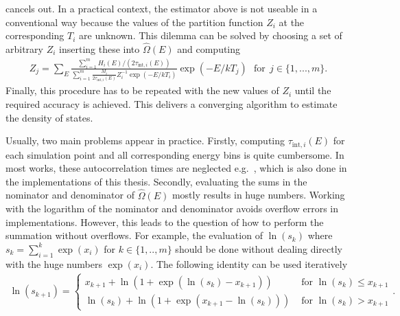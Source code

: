 cancels out. In a practical context, the estimator above is not useable in a conventional way because the values of the partition function $Z_i$
at the corresponding $T_i$ are unknown. This dilemma can be solved by choosing a set of arbitrary $Z_i$ inserting these into $\hat{\Omega}(E)$ and computing
\begin{align*}
    Z_j=\sum_E\frac{\sum_{i=1}^mH_i(E)/(2\tau_{\mathrm{int},i}(E))}{\sum_{i=1}^m\frac{M_i}{2\tau_{\mathrm{int},i}(E)}Z_i^{-1}\exp(-E/kT_i)}\exp(-E/kT_j) \  \  \  \text{for} \  \  j\in\{1,...,m\}.
\end{align*}
Finally, this procedure has to be repeated with the new values of $Z_i$ until the required accuracy is achieved. This delivers a converging algorithm to estimate the 
density of states.~\cite{Janke2012}

Usually, two main problems appear in practice. Firstly, computing $\tau_{\mathrm{int},i}(E)$ for each simulation point and all corresponding energy 
bins is quite cumbersome. In most works, these autocorrelation times are neglected e.g.~\cite{Chodera2007}, which is also done in the implementations of 
this thesis. Secondly, evaluating the sums in the nominator and denominator 
of $\hat{\Omega}(E)$ mostly results in huge numbers. Working with the logarithm of the nominator and denominator avoids overflow errors in implementations.
However, this leads to the question of how to perform the summation without overflows. For example, the evaluation of $\ln(s_k)$ where $s_k=\sum_{i=1}^k\exp(x_i)$ 
for $k\!\in\!\{1,..,m\}$ should be done without dealing directly with the huge numbers $\exp(x_i)$. The following identity can be used iteratively
\begin{align*}
    \ln(s_{k+1})=   \begin{cases}
                        x_{k+1}\!+\!\ln(1\!+\!\exp(\ln(s_k)\!-\!x_{k+1})) & \text{ for } \ln(s_k) \le x_{k+1} \\
                        \ln(s_k)\!+\!\ln(1\!+\!\exp(x_{k+1}\!-\!\ln(s_k))) & \text{ for } \ln(s_k) > x_{k+1}
                    \end{cases}.
\end{align*}


